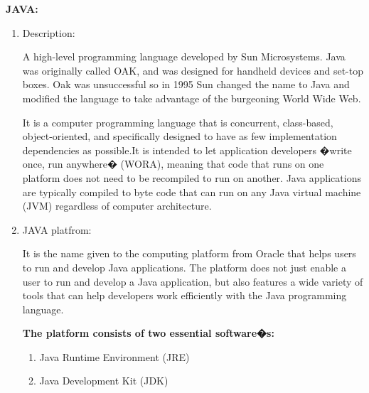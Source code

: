 {\bfseries JAVA:}
\begin{enumerate}
\item Description:

A high-level programming language developed by Sun Microsystems. Java was originally called OAK, and was designed for handheld devices and set-top boxes. Oak was unsuccessful so in 1995 Sun changed the name to Java and modified the language to take advantage of the burgeoning World Wide Web. 

It is a computer programming language that is concurrent, class-based, object-oriented, and specifically designed to have as few implementation dependencies as possible.It is intended to let application developers �write once, run anywhere� (WORA), meaning that code that runs on one platform does not need to be recompiled to run on another. Java applications are typically compiled to byte code that can run on any Java virtual machine (JVM) regardless of computer architecture.

\item JAVA platfrom:

It is the name given to the computing platform from Oracle that helps users to run and develop Java applications. The platform does not just enable a user to run and develop a Java application, but also features a wide variety of tools that can help developers work efficiently with the Java programming language.

{\bfseries The platform consists of two essential software�s:}
\begin{enumerate}
\item  Java Runtime Environment (JRE)
\item Java Development Kit (JDK)
\end{enumerate}

\end{enumerate}

